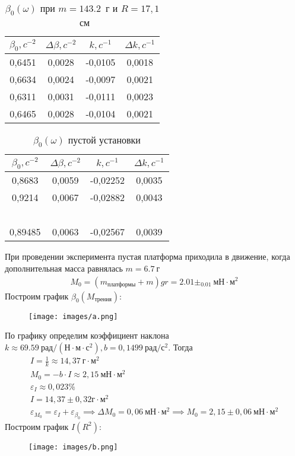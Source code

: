 \documentclass[a4paper,12pt]{article} %
\begin{document}
\begin{table}[!ht]
    \centering
    \begin{tabular}{|c|c|c|c|}
    \hline
        $\beta_0, c^{-2}$ & $\Delta \beta, c^{-2}$ & $k, c^{-1}$ & $\Delta k, c^{-1}$ \\ \hline
        0,6451 & 0,0028 & -0,0105 & 0,0018  \\ \hline
        0,6634 & 0,0024 & -0,0097 & 0,0021  \\ \hline
        0,6311 & 0,0031 & -0,0111 & 0,0023  \\ \hline
        0,6465 & 0,0028 & -0,0104 & 0,0021  \\ \hline
    \end{tabular}
    \caption{$\beta_0(\omega)$ при $m=143.2$~г и $R= 17,1$~см}
\end{table}
\begin{table}[H]
    \centering
    \begin{tabular}{|c|c|c|c|}
    \hline
        $\beta_0, c^{-2}$ & $\Delta \beta, c^{-2}$ & $k, c^{-1}$ & $\Delta k, c^{-1}$ \\ \hline
        0,8683 & 0,0059 & -0,02252 & 0,0035  \\ \hline
        0,9214 & 0,0067 & -0,02882 & 0,0043  \\ \hline
        ~ & ~ & ~ &   \\ \hline
        0,89485 & 0,0063 & -0,02567 & 0,0039  \\ \hline
    \end{tabular}
    \caption{$\beta_0(\omega)$ пустой установки}
\end{table}
\newpage
При проведении эксперимента пустая платформа приходила в движение, когда дополнительная масса равнялась $ m =  6.7 ~ \text{г}$  \begin{gather}
    M_0 = (m_{ \text{платформы}}+ m)gr = 2.01\pm_0.01 ~\text{мН} \cdot \text{м}^2  
\end{gather}  
Построим график $ \beta_0\left(M_{\text{трения}}\right) $:
\begin{figure}[h!]
    \centering
    \texttt{[image: images/a.png]}
\end{figure}
\newline
По графику определим коэффициент наклона $ k \approx 69.59~ \text{рад}/(\text{Н}\cdot \text{м} \cdot \text{с}^{2}), b = 0,1499 ~ \text{рад}/ \text{с}^2 $. Тогда \begin{gather}
    I = \frac{1}{k} \approx 14,37 ~ \text{г} \cdot \text{м}^2 \\
    M_0 = - b \cdot I \approx 2,15 ~ \text{мН} \cdot \text{м}^2 \\
    \varepsilon_{I} \approx 0,023 \% \\
    I = 14,37 \pm 0,32 \text{г} \cdot \text{м}^2 \\
    \varepsilon_{M_0} = \varepsilon_I + \varepsilon_{\beta_0} \implies \Delta M_0 = 0,06~  \text{мН} \cdot \text{м}^2 \implies M_0 = 2,15 \pm 0,06~  \text{мН} \cdot \text{м}^2
\end{gather}
Построим график $ I(R^2) $: \newline
\begin{figure}[h!]
    \centering
    \texttt{[image: images/b.png]}
\end{figure}
\end{document}
